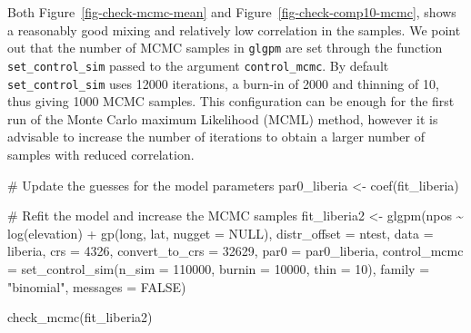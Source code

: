 \documentclass[
  letterpaper,
]{krantz}
\newenvironment{Shaded}{\begin{snugshade}}{\end{snugshade}}
\newcommand{\AttributeTok}[1]{\textcolor[rgb]{0.40,0.45,0.13}{#1}}
\newcommand{\CommentTok}[1]{\textcolor[rgb]{0.37,0.37,0.37}{#1}}
\newcommand{\ConstantTok}[1]{\textcolor[rgb]{0.56,0.35,0.01}{#1}}
\newcommand{\DecValTok}[1]{\textcolor[rgb]{0.68,0.00,0.00}{#1}}
\newcommand{\FunctionTok}[1]{\textcolor[rgb]{0.28,0.35,0.67}{#1}}
\newcommand{\NormalTok}[1]{\textcolor[rgb]{0.00,0.23,0.31}{#1}}
\newcommand{\OtherTok}[1]{\textcolor[rgb]{0.00,0.23,0.31}{#1}}
\newcommand{\SpecialCharTok}[1]{\textcolor[rgb]{0.37,0.37,0.37}{#1}}
\newcommand{\StringTok}[1]{\textcolor[rgb]{0.13,0.47,0.30}{#1}}
\begin{document}
Both Figure~\ref{fig-check-mcmc-mean} and
Figure~\ref{fig-check-comp10-mcmc}, shows a reasonably good mixing and
relatively low correlation in the samples. We point out that the number
of MCMC samples in \texttt{glgpm} are set through the function
\texttt{set\_control\_sim} passed to the argument
\texttt{control\_mcmc}. By default \texttt{set\_control\_sim} uses 12000
iterations, a burn-in of 2000 and thinning of 10, thus giving 1000 MCMC
samples. This configuration can be enough for the first run of the Monte
Carlo maximum Likelihood (MCML) method, however it is advisable to
increase the number of iterations to obtain a larger number of samples
with reduced correlation.

\begin{Shaded}
\begin{Highlighting}[]
\CommentTok{\# Update the guesses for the model parameters }
\NormalTok{par0\_liberia }\OtherTok{\textless{}{-}} \FunctionTok{coef}\NormalTok{(fit\_liberia)}

\CommentTok{\# Refit the model and increase the MCMC samples}
\NormalTok{fit\_liberia2 }\OtherTok{\textless{}{-}} 
\FunctionTok{glgpm}\NormalTok{(npos }\SpecialCharTok{\textasciitilde{}} \FunctionTok{log}\NormalTok{(elevation) }\SpecialCharTok{+} \FunctionTok{gp}\NormalTok{(long, lat, }\AttributeTok{nugget =} \ConstantTok{NULL}\NormalTok{),}
      \AttributeTok{distr\_offset =}\NormalTok{ ntest, }\AttributeTok{data =}\NormalTok{ liberia,}
      \AttributeTok{crs =} \DecValTok{4326}\NormalTok{,}
      \AttributeTok{convert\_to\_crs =} \DecValTok{32629}\NormalTok{,}
      \AttributeTok{par0 =}\NormalTok{ par0\_liberia, }
      \AttributeTok{control\_mcmc =} \FunctionTok{set\_control\_sim}\NormalTok{(}\AttributeTok{n\_sim =} \DecValTok{110000}\NormalTok{, }
                                     \AttributeTok{burnin =} \DecValTok{10000}\NormalTok{, }
                                     \AttributeTok{thin =} \DecValTok{10}\NormalTok{),}
      \AttributeTok{family =} \StringTok{"binomial"}\NormalTok{, }\AttributeTok{messages =} \ConstantTok{FALSE}\NormalTok{)}

\FunctionTok{check\_mcmc}\NormalTok{(fit\_liberia2)}
\end{Highlighting}
\end{Shaded}
\end{document}
